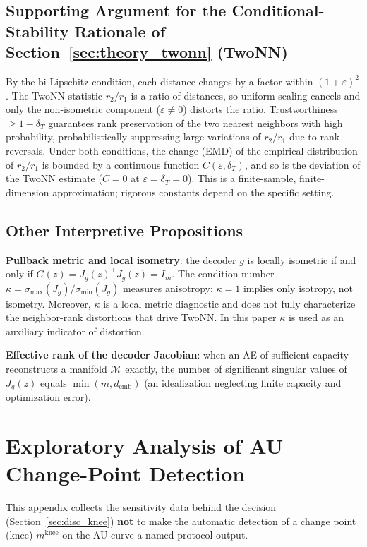 \documentclass[make,article,submit,pdftex,moreauthors]{Definitions/mdpi}
\newcommand{\Jg}{J_g}
\newcommand{\kap}{\kappa}
\newcommand{\demb}{d_{\mathrm{emb}}}
\newcommand{\mknee}{m^{\mathrm{knee}}}
\begin{document}
\subsection[\appendixname~\thesubsection]{Supporting Argument for the Conditional-Stability Rationale of Section~\ref{sec:theory_twonn} (TwoNN)}

By the bi-Lipschitz condition, each distance changes by a factor within
$(1 \mp \varepsilon)^2$.
The TwoNN statistic $r_2/r_1$ is a ratio of distances, so uniform scaling
cancels and only the non-isometric component ($\varepsilon \neq 0$) distorts
the ratio.
Trustworthiness $\geq 1 - \delta_T$ guarantees rank preservation of the two
nearest neighbors with high probability, probabilistically suppressing large
variations of $r_2/r_1$ due to rank reversals.
Under both conditions, the change (EMD) of the empirical distribution of
$r_2/r_1$ is bounded by a continuous function $C(\varepsilon, \delta_T)$,
and so is the deviation of the TwoNN estimate
($C = 0$ at $\varepsilon = \delta_T = 0$).
This is a finite-sample, finite-dimension approximation; rigorous constants
depend on the specific setting.

\subsection[\appendixname~\thesubsection]{Other Interpretive Propositions}

\textbf{Pullback metric and local isometry}:
the decoder $g$ is locally isometric if and only if
$G(z) = \Jg(z)^\top \Jg(z) = I_m$.
The condition number $\kap = \sigma_{\max}(\Jg)/\sigma_{\min}(\Jg)$ measures
anisotropy; $\kap = 1$ implies only isotropy, not isometry.
Moreover, $\kap$ is a local metric diagnostic and does not fully
characterize the neighbor-rank distortions that drive TwoNN.
In this paper $\kap$ is used as an auxiliary indicator of distortion.

\textbf{Effective rank of the decoder Jacobian}:
when an AE of sufficient capacity reconstructs a manifold $\mathcal{M}$
exactly, the number of significant singular values of $\Jg(z)$ equals
$\min(m, \demb)$ (an idealization neglecting finite capacity and
optimization error).

\section[\appendixname~\thesection]{Exploratory Analysis of AU Change-Point Detection}\label{app:knee}

This appendix collects the sensitivity data behind the decision
(Section~\ref{sec:disc_knee}) \textbf{not} to make the automatic detection
of a change point (knee) $\mknee$ on the AU curve a named protocol output.
\end{document}

